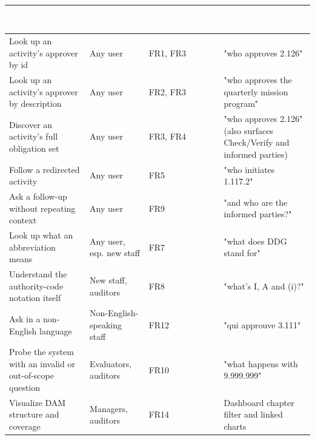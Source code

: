 \begin{longtable}{|p{}|p{}|p{}|p{}|}
\hline
\rowcolor{thesisgreen}\textcolor{white}{\textbf{Use case}} & \textcolor{white}{\textbf{Primary actor}} & \textcolor{white}{\textbf{Requirement(s)}} & \textcolor{white}{\textbf{Example}} \\
\hline\endhead
Look up an activity's approver by id & Any user & FR1, FR3 & "who approves 2.126" \\
\hline
Look up an activity's approver by description & Any user & FR2, FR3 & "who approves the quarterly mission program" \\
\hline
Discover an activity's full obligation set & Any user & FR3, FR4 & "who approves 2.126" (also surfaces Check/Verify and informed parties) \\
\hline
Follow a redirected activity & Any user & FR5 & "who initiates 1.117.2" \\
\hline
Ask a follow-up without repeating context & Any user & FR9 & "and who are the informed parties?" \\
\hline
Look up what an abbreviation means & Any user, esp. new staff & FR7 & "what does DDG stand for" \\
\hline
Understand the authority-code notation itself & New staff, auditors & FR8 & "what's I, A and (i)?" \\
\hline
Ask in a non-English language & Non-English-speaking staff & FR12 & "qui approuve 3.111" \\
\hline
Probe the system with an invalid or out-of-scope question & Evaluators, auditors & FR10 & "what happens with 9.999.999" \\
\hline
Visualize DAM structure and coverage & Managers, auditors & FR14 & Dashboard chapter filter and linked charts \\
\hline
\end{longtable}
